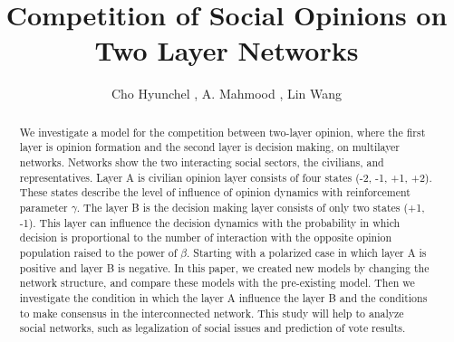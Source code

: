 \documentclass[english]{cccconf}
\begin{document}
\title{Competition of Social Opinions on Two Layer Networks}


\author{Cho Hyunchel ,
        A. Mahmood ,
        Lin Wang }

\maketitle

\begin{abstract}
We investigate a model for the competition between two-layer opinion, where the first layer is opinion formation and the second layer is decision making, on multilayer networks. Networks show the two interacting social sectors, the civilians, and representatives. Layer A is civilian opinion layer consists of four states (-2, -1, +1, +2). These states describe the level of influence of opinion dynamics with reinforcement parameter $\gamma$. The layer B is the decision making layer consists of only two states (+1, -1).  This layer can influence the decision dynamics with the probability in which decision is proportional to the number of interaction with the opposite opinion population raised to the power of $\beta$. Starting with a polarized case in which layer A is positive and layer B is negative. In this paper, we created new models by changing the network structure, and compare these models with the pre-existing model. Then we investigate the condition in which the layer A influence the layer B and the conditions to make consensus in the interconnected network.  This study will help to analyze social networks, such as legalization of social issues and prediction of vote results.
\end{abstract}
\end{document}

